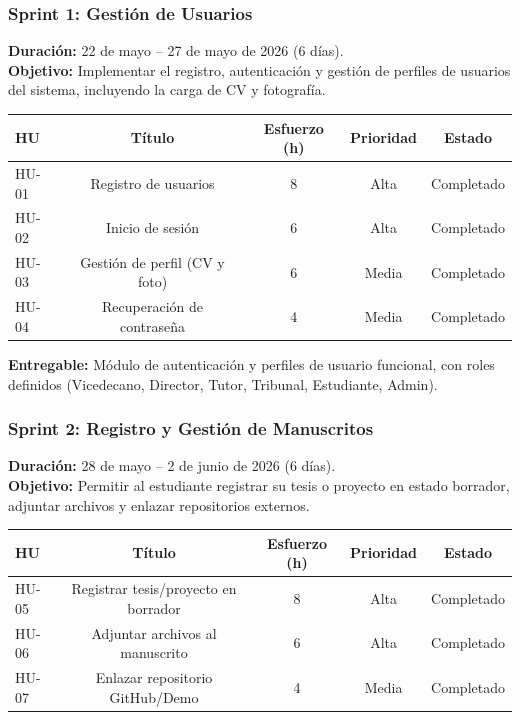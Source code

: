 \subsubsection{Sprint 1: Gestión de Usuarios}
\label{sprint:1}

\textbf{Duración:} 22 de mayo – 27 de mayo de 2026 (6 días). \\
\textbf{Objetivo:} Implementar el registro, autenticación y gestión de perfiles de usuarios del sistema, incluyendo la carga de CV y fotografía.

\begin{center}
\begin{tabular}{lcccc}
\toprule
\textbf{HU} & \textbf{Título} & \textbf{Esfuerzo (h)} & \textbf{Prioridad} & \textbf{Estado} \\
\midrule
HU-01 & Registro de usuarios & 8 & Alta & Completado \\
HU-02 & Inicio de sesión & 6 & Alta & Completado \\
HU-03 & Gestión de perfil (CV y foto) & 6 & Media & Completado \\
HU-04 & Recuperación de contraseña & 4 & Media & Completado \\
\bottomrule
\end{tabular}
\end{center}

\textbf{Entregable:} Módulo de autenticación y perfiles de usuario funcional, con roles definidos (Vicedecano, Director, Tutor, Tribunal, Estudiante, Admin).

\subsubsection{Sprint 2: Registro y Gestión de Manuscritos}
\label{sprint:2}

\textbf{Duración:} 28 de mayo – 2 de junio de 2026 (6 días). \\
\textbf{Objetivo:} Permitir al estudiante registrar su tesis o proyecto en estado borrador, adjuntar archivos y enlazar repositorios externos.

\begin{center}
\begin{tabular}{lcccc}
\toprule
\textbf{HU} & \textbf{Título} & \textbf{Esfuerzo (h)} & \textbf{Prioridad} & \textbf{Estado} \\
\midrule
HU-05 & Registrar tesis/proyecto en borrador & 8 & Alta & Completado \\
HU-06 & Adjuntar archivos al manuscrito & 6 & Alta & Completado \\
HU-07 & Enlazar repositorio GitHub/Demo & 4 & Media & Completado \\
\bottomrule
\end{tabular}
\end{center}

